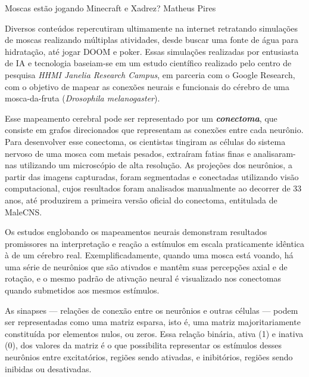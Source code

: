 
\hypearticle
{Moscas estão jogando Minecraft e Xadrez?}
{Matheus Pires}
{

Diversos conteúdos repercutiram ultimamente na internet retratando simulações de moscas realizando múltiplas atividades, desde buscar uma fonte de água para hidratação, até jogar DOOM e poker. Essas simulações realizadas por entusiasta de IA e tecnologia baseiam-se em um estudo científico realizado pelo centro de pesquisa \textit{HHMI Janelia Research Campus}, em parceria com o Google Research, com o objetivo de mapear as conexões neurais e funcionais do cérebro de uma mosca-da-fruta (\textit{Drosophila melanogaster}).

Esse mapeamento cerebral pode ser representado por um \textbf{\textit{conectoma}}, que consiste em grafos direcionados que representam as conexões entre cada neurônio. Para desenvolver esse conectoma, os cientistas tingiram as células do sistema nervoso de uma mosca com metais pesados, extraíram fatias finas e analisaram-nas utilizando um microscópio de alta resolução. As projeções dos neurônios, a partir das imagens capturadas, foram segmentadas e conectadas utilizando visão computacional, cujos resultados foram analisados manualmente ao decorrer de 33 anos, até produzirem a primeira versão oficial do conectoma, entitulada de MaleCNS.

Os estudos englobando os mapeamentos neurais demonstram resultados promissores na interpretação e reação a estímulos em escala praticamente idêntica à de um cérebro real. Exemplificadamente, quando uma mosca está voando, há uma série de neurônios que são ativados e mantêm suas percepções axial e de rotação, e o mesmo padrão de ativação neural é visualizado nos conectomas quando submetidos aos mesmos estímulos.

As sinapses --- relações de conexão entre os neurônios e outras células --- podem ser representadas como uma matriz esparsa, isto é, uma matriz majoritariamente constituída por elementos nulos, ou zeros. Essa relação binária, ativa (1) e inativa (0), dos valores da matriz é o que possibilita representar os estímulos desses neurônios entre excitatórios, regiões sendo ativadas, e inibitórios, regiões sendo inibidas ou desativadas.



}
